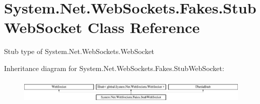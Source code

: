 \hypertarget{class_system_1_1_net_1_1_web_sockets_1_1_fakes_1_1_stub_web_socket}{\section{System.\-Net.\-Web\-Sockets.\-Fakes.\-Stub\-Web\-Socket Class Reference}
\label{class_system_1_1_net_1_1_web_sockets_1_1_fakes_1_1_stub_web_socket}
}


Stub type of System.\-Net.\-Web\-Sockets.\-Web\-Socket 


Inheritance diagram for System.\-Net.\-Web\-Sockets.\-Fakes.\-Stub\-Web\-Socket\-:\begin{figure}[H]
\begin{center}
\leavevmode
\includegraphics[height=1.192758cm]{class_system_1_1_net_1_1_web_sockets_1_1_fakes_1_1_stub_web_socket}
\end{center}
\end{figure}
